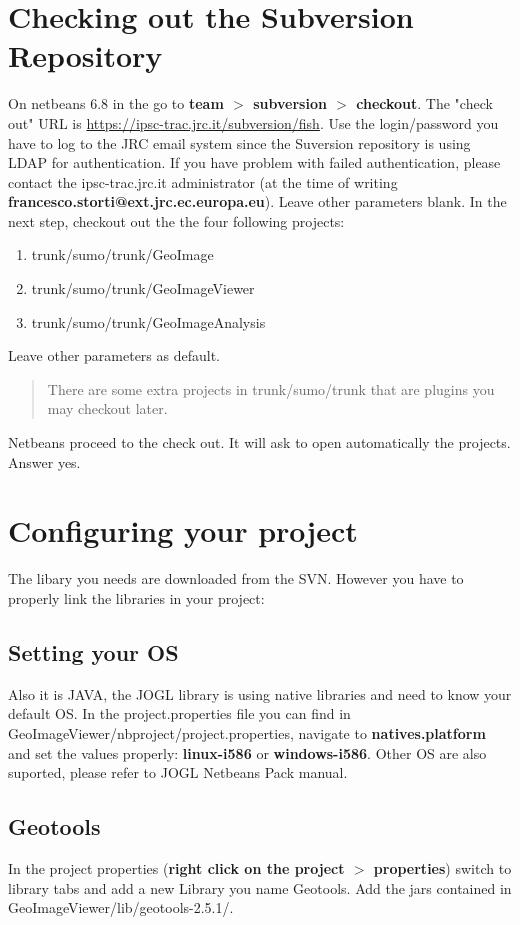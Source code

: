 \documentclass[12pt,a4paper,final,makeidx]{report}
\begin{document}
\section{Checking out the Subversion Repository}
On netbeans 6.8 in the go to \textbf{team $>$ subversion $>$ checkout}.
The "check out" URL is \url{https://ipsc-trac.jrc.it/subversion/fish}.
Use the login/password you have to log to the JRC email system since the Suversion repository is using LDAP for authentication.
If you have problem with failed authentication, please contact the ipsc-trac.jrc.it administrator (at the time of writing \textbf{francesco.storti@ext.jrc.ec.europa.eu}).
Leave other parameters blank.
In the next step, checkout out the the four following projects:
\begin{enumerate}
\item trunk/sumo/trunk/GeoImage
\item trunk/sumo/trunk/GeoImageViewer
\item trunk/sumo/trunk/GeoImageAnalysis
\end{enumerate}
Leave other parameters as default.
\begin{quote}
There are some extra projects in trunk/sumo/trunk that are plugins you may checkout later.
\end{quote}
Netbeans proceed to the check out. It will ask to open automatically the projects. Answer yes.

\section{Configuring your project}
The libary you needs are downloaded from the SVN. However you have to properly link the libraries in your project:
\subsection{Setting your OS}
Also it is JAVA, the JOGL library is using native libraries and need to know your default OS.
In the project.properties file you can find in GeoImageViewer/nbproject/project.properties, navigate to \textbf{natives.platform} and set the values properly: \textbf{linux-i586} or \textbf{windows-i586}.
Other OS are also suported, please refer to JOGL Netbeans Pack manual.

\subsection{Geotools}
In the project properties (\textbf{right click on the project $>$ properties}) switch to library tabs and add a new Library you name Geotools.
Add the jars contained in GeoImageViewer/lib/geotools-2.5.1/.
\end{document}
